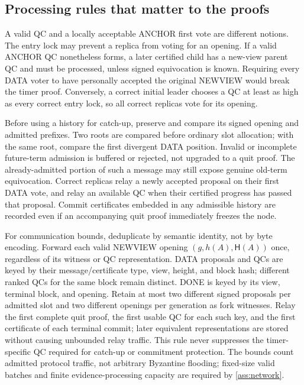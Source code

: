\documentclass[11pt,a4paper]{article}
\newcommand{\Hash}{\mathsf H}
\newcounter{protocol}
\begin{document}
\subsection{Processing rules that matter to the proofs}
\label{sec:processing}
A valid QC and a locally acceptable ANCHOR first vote are different notions.
The entry lock may prevent a replica from voting for an opening. If a
valid ANCHOR QC nonetheless forms, a later certified child has a new-view
parent QC and must be processed, unless signed equivocation is known.
Requiring every DATA voter to have personally accepted the original
NEWVIEW would break the timer proof. Conversely, a correct initial leader
chooses a QC at least as high as every correct entry lock, so all correct
replicas vote for its opening.

Before using a history for catch-up, preserve and compare its signed
opening and admitted prefixes. Two roots are compared before ordinary
slot allocation; with the same root, compare the first divergent DATA
position. Invalid or incomplete future-term admission is buffered or
rejected, not upgraded to a quit proof. The already-admitted portion of
such a message may still expose genuine old-term equivocation.
Correct replicas relay a newly accepted proposal on their first DATA vote,
and relay an available QC when their certified progress has passed that
proposal. Commit certificates embedded in any admissible history are
recorded even if an accompanying quit proof immediately freezes the node.

For communication bounds, deduplicate by semantic identity, not by byte
encoding. Forward each valid NEWVIEW opening $(g,h(A),\Hash(A))$ once,
regardless of its witness or QC representation. DATA proposals and QCs
are keyed by their message/certificate type, view, height, and block hash;
different ranked QCs for the same block remain distinct. DONE is keyed
by its view, terminal block, and opening. Retain at most two different
signed proposals per admitted slot and two different openings per
generation as fork witnesses. Relay the first complete quit proof, the
first usable QC for each such key, and the first certificate of each
terminal commit; later equivalent representations are stored without
causing unbounded relay traffic. This rule never suppresses the
timer-specific QC required for catch-up or commitment protection.
The bounds count admitted protocol traffic, not arbitrary Byzantine
flooding; fixed-size valid batches and finite evidence-processing capacity
are required by \cref{ass:network}.
\end{document}
